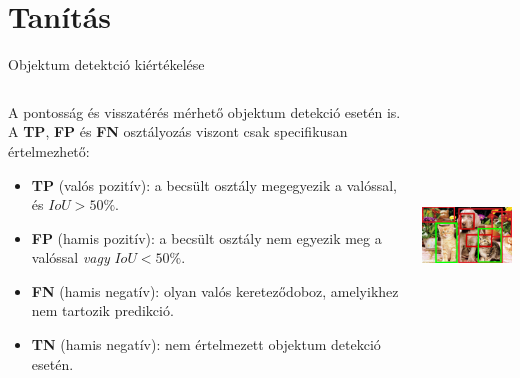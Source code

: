 \documentclass[english, aspectratio=169]{beamer}
\makeatletter
\let\origtableofcontents=\tableofcontents
\def\tableofcontents{\@ifnextchar[{\origtableofcontents}{\gobbletableofcontents}}
\def\gobbletableofcontents#1{\origtableofcontents}
\makeatother
\begin{document}
\section{Tanítás}

\begin{frame}
\tableofcontents[currentsection]
\end{frame}

\begin{frame}{Objektum detektció kiértékelése}
\begin{columns}
\begin{column}{.65\textwidth}
A pontosság és visszatérés mérhető objektum detekció esetén is. A \textbf{TP}, \textbf{FP} és \textbf{FN} osztályozás viszont csak specifikusan értelmezhető:
\begin{itemize}
	\item \textbf{TP} (valós pozitív): a becsült osztály megegyezik a valóssal, és $IoU>50\%$.
	\item \textbf{FP} (hamis pozitív): a becsült osztály nem egyezik meg a valóssal \emph{vagy} $IoU<50\%$.
	\item \textbf{FN} (hamis negatív): olyan valós kereteződoboz, amelyikhez nem tartozik predikció.
	\item \textbf{TN} (hamis negatív): nem értelmezett objektum detekció esetén.
\end{itemize}
\end{column}
\begin{column}{.35\textwidth}
\begin{center}
\includegraphics[height=7cm, width=5cm, keepaspectratio]{images/od_8.png}
\end{center}
\end{column}
\end{columns}
\end{frame}
\end{document}
